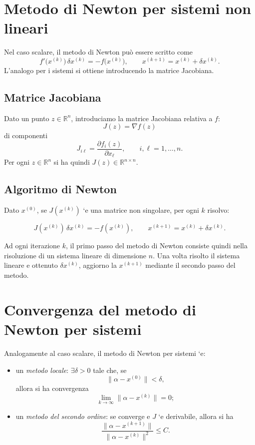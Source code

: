 \documentclass[11pt,a4paper]{report}
\newcommand{\R}{\mathbb{R}}
\begin{document}
\section{Metodo di Newton per sistemi non lineari}
Nel caso scalare, il metodo di Newton pu\`o essere scritto come
\[
 f'\bigl(x^{(k)}\bigr)\,\delta x^{(k)}=-f\bigl(x^{(k)}\bigr),
 \qquad
 x^{(k+1)}=x^{(k)}+\delta x^{(k)}.
\]
L'analogo per i sistemi si ottiene introducendo la matrice Jacobiana.

\subsection{Matrice Jacobiana}
Dato un punto $z\in\R^n$, introduciamo la matrice Jacobiana relativa a $f$:
\[
 J(z)=\nabla f(z)
\]
di componenti
\[
 J_{i\ell}=\frac{\partial f_i(z)}{\partial x_\ell},\qquad i,\ell=1,\dots,n.
\]
Per ogni $z\in\R^n$ si ha quindi $J(z)\in\R^{n\times n}$.

\subsection{Algoritmo di Newton}
Dato $x^{(0)}$, se $J(x^{(k)})$ `e una matrice non singolare, per ogni $k$ risolvo:
\begin{formulaBox}
\[
 J(x^{(k)})\,\delta x^{(k)}=-f(x^{(k)}),
 \qquad
 x^{(k+1)}=x^{(k)}+\delta x^{(k)}.
\]
\end{formulaBox}
Ad ogni iterazione $k$, il primo passo del metodo di Newton consiste quindi nella risoluzione di un sistema lineare di dimensione $n$. Una volta risolto il sistema lineare e ottenuto $\delta x^{(k)}$, aggiorno la $x^{(k+1)}$ mediante il secondo passo del metodo.

\section{Convergenza del metodo di Newton per sistemi}
Analogamente al caso scalare, il metodo di Newton per sistemi `e:
\begin{itemize}
  \item un \emph{metodo locale}: $\exists\delta>0$ tale che, se
  \[
   \|\alpha-x^{(0)}\|<\delta,
  \]
  allora si ha convergenza
  \[
   \lim_{k\to\infty}\|\alpha-x^{(k)}\|=0;
  \]
  \item un \emph{metodo del secondo ordine}: se converge e $J$ `e derivabile, allora si ha
  \[
   \frac{\|\alpha-x^{(k+1)}\|}{\|\alpha-x^{(k)}\|^2}\le C.
  \]
\end{itemize}
\end{document}
